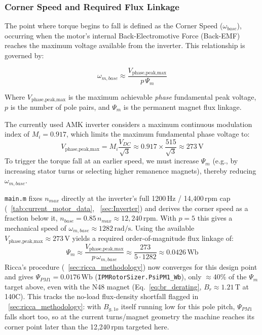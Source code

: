 \documentclass[10pt,final,journal,a4paper,oneside,twocolumn]{IEEEtran}
\begin{document}
\subsubsection{Corner Speed and Required Flux Linkage}
\label{sec:corner_speed}
The point where torque begins to fall is defined as the Corner Speed ($\omega_{base}$), occurring when the motor's internal Back-Electromotive Force (Back-EMF) reaches the maximum voltage available from the inverter. This relationship is governed by:

\begin{equation}
\omega_{m,base} \approx \frac{V_{\text{phase,peak,max}}}{p\,\Psi_m}
\end{equation}

Where $V_{\text{phase,peak,max}}$ is the maximum achievable \emph{phase} fundamental peak voltage, $p$ is the number of pole pairs, and $\Psi_m$ is the permanent magnet flux linkage.

The currently used AMK inverter considers a maximum continuous modulation index of $M_i=0.917$, which limits the maximum fundamental phase voltage to:
\begin{equation}
    V_{\text{phase,peak,max}} = M_i \frac{V_{DC}}{\sqrt{3}} \approx 0.917 \times \frac{515}{\sqrt{3}} \approx 273\,\text{V}
\end{equation}
To trigger the torque fall at an earlier speed, we must increase $\Psi_m$ (e.g., by increasing stator turns or selecting higher remanence magnets), thereby reducing $\omega_{m,base}$.

\texttt{main.m} fixes $n_{max}$ directly at the inverter's full 1200\,Hz / 14,400\,rpm cap (\tablename~\ref{tab:current_motor_data}, \sectionname~\ref{sec:Inverter}) and derives the corner speed as a fraction below it, $n_{base}=0.85\,n_{max}\approx12{,}240\,\text{rpm}$. With $p=5$ this gives a mechanical speed of $\omega_{m,base}\approx 1282\,\text{rad/s}$. Using the available $V_{\text{phase,peak,max}}\approx 273\,\text{V}$ yields a required order-of-magnitude flux linkage of:
\begin{equation}
    \Psi_m \approx \frac{V_{\text{phase,peak,max}}}{p\,\omega_{m,base}} \approx \frac{273}{5 \cdot 1282} \approx 0.0426\,\text{Wb}
\end{equation}
Ricca's procedure (\sectionname~\ref{sec:ricca_methodology}) now converges for this design point and gives $\Psi_{PM1}=0.0176\,\text{Wb}$ (\texttt{IPMRotorSizer.PsiPM1\_Wb}), only $\approx$40\% of the $\Psi_m$ target above, even with the N48 magnet (Eq.~\ref{eq:br_derating}, $B_r\approx1.21\,\text{T}$ at 140\textdegree{}C). This tracks the no-load flux-density shortfall flagged in \sectionname~\ref{sec:ricca_methodology}: with $B_{g,1o}$ itself running low for this pole pitch, $\Psi_{PM1}$ falls short too, so at the current turns/magnet geometry the machine reaches its corner point later than the 12,240\,rpm targeted here.
\end{document}
